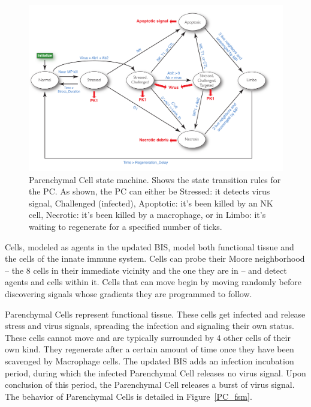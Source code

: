 \documentclass[10pt,conference]{IEEEtran}
\begin{document}
\begin{figure}[h]
\centering
\captionsetup{justification=centering,width=7.0in}
\includegraphics[width=7in]{PC_fsm}
\caption{Parenchymal Cell state machine. Shows the state transition rules for the PC. As shown, the PC can either be Stressed: it detects 
virus signal, Challenged (infected), Apoptotic: it's been killed by an NK cell, Necrotic: it's been killed by a macrophage, or in Limbo: it's waiting 
to regenerate for a specified number of ticks.}
\label{fig:pe_seq}
\end{figure}

Cells, modeled as agents in the updated BIS, model both functional tissue and the cells of the innate immune system. Cells can probe their 
Moore neighborhood -- the 8 cells in their immediate vicinity and the one they are in -- and detect agents and cells within it. Cells that can 
move begin by moving randomly before discovering signals whose gradients they are programmed to follow.

\indent
Parenchymal Cells represent functional tissue. These cells get infected and release stress and virus signals, spreading the infection and 
signaling their own status. These cells cannot move and are typically surrounded by 4 other cells of their own kind. They regenerate after a 
certain amount of time once they have been scavenged by Macrophage cells. The updated BIS adds an infection incubation period, during 
which the infected Parenchymal Cell releases no virus signal. Upon conclusion of this period, the Parenchymal Cell releases a burst of virus 
signal. The behavior of Parenchymal Cells is detailed in Figure~\ref{PC_fsm}.
\end{document}
